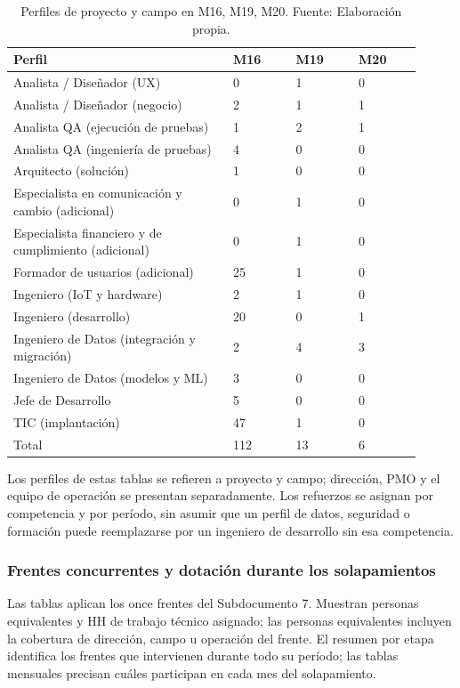 \documentclass[11pt]{article}
\begin{document}
\begingroup
\small
\begin{longtable}{@{}p{0.49\linewidth}p{0.14\linewidth}p{0.14\linewidth}p{0.14\linewidth}@{}}
\caption[Perfiles de proyecto y campo en M16, M19, M20]{Perfiles de proyecto y campo en M16, M19, M20. Fuente: Elaboración propia.}\label{tab:t15-10}\\
\toprule
\textbf{Perfil} & \textbf{M16} & \textbf{M19} & \textbf{M20} \\
\midrule
\endhead
\bottomrule
\endlastfoot
Analista / Diseñador (UX) & 0 & 1 & 0 \\
Analista / Diseñador (negocio) & 2 & 1 & 1 \\
Analista QA (ejecución de pruebas) & 1 & 2 & 1 \\
Analista QA (ingeniería de pruebas) & 4 & 0 & 0 \\
Arquitecto (solución) & 1 & 0 & 0 \\
Especialista en comunicación y cambio (adicional) & 0 & 1 & 0 \\
Especialista financiero y de cumplimiento (adicional) & 0 & 1 & 0 \\
Formador de usuarios (adicional) & 25 & 1 & 0 \\
Ingeniero (IoT y hardware) & 2 & 1 & 0 \\
Ingeniero (desarrollo) & 20 & 0 & 1 \\
Ingeniero de Datos (integración y migración) & 2 & 4 & 3 \\
Ingeniero de Datos (modelos y ML) & 3 & 0 & 0 \\
Jefe de Desarrollo & 5 & 0 & 0 \\
TIC (implantación) & 47 & 1 & 0 \\
Total & 112 & 13 & 6 \\
\end{longtable}
\endgroup

Los perfiles de estas tablas se refieren a proyecto y campo; dirección, PMO y el equipo de operación se presentan separadamente. Los refuerzos se asignan por competencia y por período, sin asumir que un perfil de datos, seguridad o formación puede reemplazarse por un ingeniero de desarrollo sin esa competencia.

\subsubsection{Frentes concurrentes y dotación durante los solapamientos}

Las tablas aplican los once frentes del Subdocumento 7. Muestran personas equivalentes y HH de trabajo técnico asignado; las personas equivalentes incluyen la cobertura de dirección, campo u operación del frente. El resumen por etapa identifica los frentes que intervienen durante todo su período; las tablas mensuales precisan cuáles participan en cada mes del solapamiento.
\end{document}
